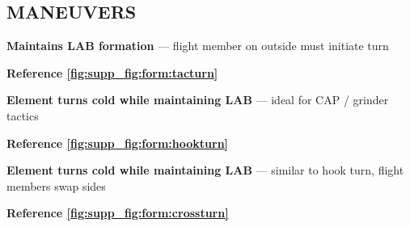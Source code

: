 \subsection{MANEUVERS}

\begin{tcoloritemize}
    \textbf{Maintains LAB formation} --- flight member on outside must initiate turn
    
    \hfill\textbf{Reference \cref{fig:supp_fig:form:tacturn}}

    \textbf{Element turns cold while maintaining LAB} --- ideal for CAP / grinder tactics
    
    \hfill\textbf{Reference \cref{fig:supp_fig:form:hookturn}}

    \textbf{Element turns cold while maintaining LAB} --- similar to hook turn, flight members swap sides
    
    \hfill\textbf{Reference \cref{fig:supp_fig:form:crossturn}}
\end{tcoloritemize}

